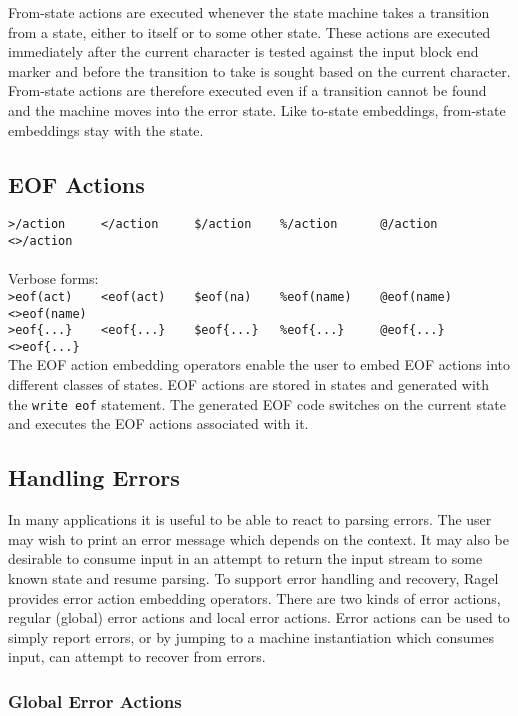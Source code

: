 \documentclass[letterpaper,11pt,oneside]{book}
\begin{document}
From-state actions are executed whenever the state machine takes a transition from a
state, either to itself or to some other state. These actions are executed
immediately after the current character is tested against the input block end
marker and before the transition to take is sought based on the current
character. From-state actions are therefore executed even if a transition
cannot be found and the machine moves into the error state.  Like to-state
embeddings, from-state embeddings stay with the state.

\subsection{EOF Actions}

\noindent\verb|>/action     </action     $/action    %/action      @/action      <>/action|\\
\\
\noindent Verbose forms:\\
\noindent\verb|>eof(act)    <eof(act)    $eof(na)    %eof(name)    @eof(name)    <>eof(name)|\\
\noindent\verb|>eof{...}    <eof{...}    $eof{...}   %eof{...}     @eof{...}     <>eof{...}|
\\


The EOF action embedding operators enable the user to embed EOF actions into
different classes of
states.  EOF actions are stored in states and generated with the \verb|write eof|
statement. The generated EOF code switches on the current state and executes the EOF
actions associated with it.

\subsection{Handling Errors}

In many applications it is useful to be able to react to parsing errors.  The
user may wish to print an error message which depends on the context.  It
may also be desirable to consume input in an attempt to return the input stream
to some known state and resume parsing. To support error handling and recovery,
Ragel provides error action embedding operators. There are two kinds of error
actions, regular (global) error actions and local error actions.
Error actions can be used to simply report errors, or by jumping to a machine
instantiation which consumes input, can attempt to recover from errors.  

\subsubsection{Global Error Actions}
\end{document}
